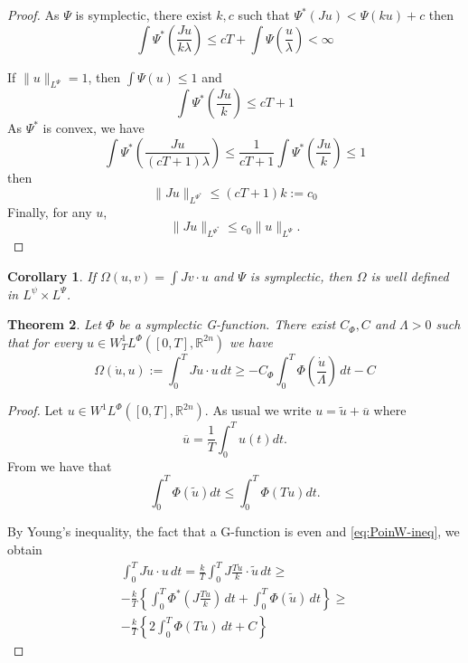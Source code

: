 \documentclass[twoside]{article}
\newtheorem{thm}{Theorem}[section]
\newtheorem{cor}[thm]{Corollary}
\theoremstyle{remark}
\newcommand{\rr}{\mathbb{R}}
\renewcommand{\leq}{\leqslant}
\renewcommand{\geq}{\geqslant}
\begin{document}
\begin{proof}
As $\Psi$ is symplectic, there exist $k,c$ such that
$
\Psi^*(Ju)<\Psi(ku)+c
$
then 
\[
\int \Psi^*\left(\frac{Ju}{k \lambda}\right) \leq cT+\int \Psi\left(\frac{u}{\lambda}\right)<\infty
\]

If $\|u\|_{L^{\Psi}}=1$, then $\int \Psi(u)\leq 1$ and
\[
\int \Psi^*\left(\frac{Ju}{k}\right) \leq cT+1 
\]
As $\Psi^*$ is convex, we have 
\[
\int \Psi^*\left(\frac{Ju}{(cT+1) \lambda}\right) 
\leq \frac{1}{cT+1} \int \Psi^*\left(\frac{Ju}{k}\right)\leq 1
\]
then 
\[
\|Ju \|_{L^{\Psi^*}}\leq (cT+1)k:=c_0
\]
Finally, for any $u$, 
\[
\|Ju\|_{L^{\Psi^*}}\leq c_0\|u\|_{L^{\Psi}}.
\]
\end{proof}



\begin{cor}
If $
\Omega(u,v)=\int J v\cdot u
$
and $\Psi$ is symplectic, then $\Omega$ is well defined in $L^{\psi} \times L^{\Psi}$.
\end{cor}







\begin{thm}
Let $\Phi$ be a symplectic G-function. 
There exist  $C_{\Phi},C$ and $\Lambda>0$ such that for every $u \in W_T^1L^{\Phi}([0,T],\rr^{2n})$
we have
\begin{equation}\label{eq:cotaJu}
\Omega(\dot{u},u):=\int_0^T J\dot{u}\cdot u\,dt\geq -C_{\Phi}\int_0^T \Phi\left(\frac{\dot{u}}{\Lambda}\right)\,dt-C
\end{equation}
\end{thm}


\begin{proof}
Let  $u\in W^1L^{\Phi}([0,T],\rr^{2n})$. As usual we write $u=\tilde{u}+\overline{u}$ where
 \[\overline{u}=\frac{1}{T}\int_0^Tu(t)dt.\]
 From \cite[Lem. 2.4]{MA2017} we have that
\begin{equation}\label{eq:PoinW-ineq}
\int_0^T\Phi(\tilde{u})dt\leq\int_0^T\Phi(T\dot{u})dt.
 \end{equation}

By Young's inequality, the fact that a G-function is even and \eqref{eq:PoinW-ineq}, we obtain
\[
\begin{split}
\int_0^T J\dot{u} \cdot u \,dt=\frac{k}{T}\int_0^T J\frac{T\dot{u}}{k}\cdot \tilde{u} \,dt\geq 
\\
-\frac{k}{T}\left\{\int_0^T \Phi^* \left(J\frac{T\dot{u}}{k}\right) \,dt+\int_0^T \Phi(\tilde{u}) \,dt\right\}\geq
\\
-\frac{k}{T}\left\{ 2\int_0^T \Phi(T\dot{u})\,dt+C\right\}
\end{split}
\]
\end{proof}
\end{document}
